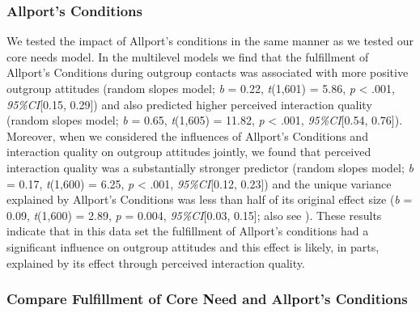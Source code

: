 \subsubsection{Allport's Conditions}

We tested the impact of Allport's conditions in the same manner as we
tested our core needs model. In the multilevel models we find that the
fulfillment of Allport's Conditions during outgroup contacts was
associated with more positive outgroup attitudes (random slopes model;
\textit{b} = 0.22, \textit{t}(1,601) = 5.86, \textit{p} \textless{}
.001, \textit{95\%CI}{[}0.15, 0.29{]}) and also predicted higher
perceived interaction quality (random slopes model; \textit{b} = 0.65,
\textit{t}(1,605) = 11.82, \textit{p} \textless{} .001,
\textit{95\%CI}{[}0.54, 0.76{]}). Moreover, when we considered the
influences of Allport's Conditions and interaction quality on outgroup
attitudes jointly, we found that perceived interaction quality was a
substantially stronger predictor (random slopes model; \textit{b} =
0.17, \textit{t}(1,600) = 6.25, \textit{p} \textless{} .001,
\textit{95\%CI}{[}0.12, 0.23{]}) and the unique variance explained by
Allport's Conditions was less than half of its original effect size
(\textit{b} = 0.09, \textit{t}(1,600) = 2.89, \textit{p} = 0.004,
\textit{95\%CI}{[}0.03, 0.15{]}; also see
). These results indicate that in
this data set the fulfillment of Allport's conditions had a significant
influence on outgroup attitudes and this effect is likely, in parts,
explained by its effect through perceived interaction quality.

\subsubsection{Compare Fulfillment of Core Need and Allport's Conditions}


